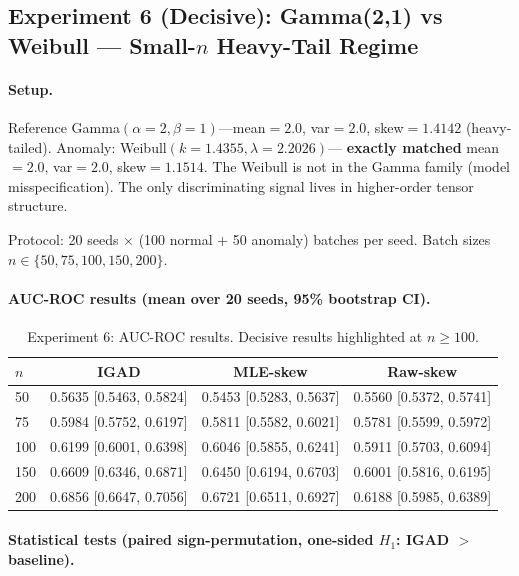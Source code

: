 \documentclass[12pt]{article}
\begin{document}
\subsection{Experiment 6 (Decisive): Gamma(2,1) vs Weibull --- Small-$n$ Heavy-Tail Regime}
\label{sec:exp-decisive}

\paragraph{Setup.}
Reference Gamma$(\alpha{=}2,\beta{=}1)$---mean$=2.0$, var$=2.0$,
skew$=1.4142$ (heavy-tailed). Anomaly: Weibull$(k{=}1.4355,\lambda{=}2.2026)$---%
\textbf{exactly matched} mean$=2.0$, var$=2.0$, skew$=1.1514$. The Weibull is
not in the Gamma family (model misspecification). The only discriminating signal
lives in higher-order tensor structure.

Protocol: 20 seeds $\times$ (100 normal + 50 anomaly) batches per seed.
Batch sizes $n \in \{50, 75, 100, 150, 200\}$.

\paragraph{AUC-ROC results (mean over 20 seeds, 95\% bootstrap CI).}

\begin{table}[h]
\centering
\caption{Experiment 6: AUC-ROC results. Decisive results highlighted at $n\geq 100$.}
\begin{tabular}{lccc}
\toprule
$n$ & IGAD & MLE-skew & Raw-skew \\
\midrule
50 & 0.5635 [0.5463, 0.5824] & 0.5453 [0.5283, 0.5637] & 0.5560 [0.5372, 0.5741] \\
75 & 0.5984 [0.5752, 0.6197] & 0.5811 [0.5582, 0.6021] & 0.5781 [0.5599, 0.5972] \\
100 & 0.6199 [0.6001, 0.6398] & 0.6046 [0.5855, 0.6241] & 0.5911 [0.5703, 0.6094] \\
150 & 0.6609 [0.6346, 0.6871] & 0.6450 [0.6194, 0.6703] & 0.6001 [0.5816, 0.6195] \\
200 & 0.6856 [0.6647, 0.7056] & 0.6721 [0.6511, 0.6927] & 0.6188 [0.5985, 0.6389] \\
\bottomrule
\end{tabular}
\end{table}

\paragraph{Statistical tests (paired sign-permutation, one-sided $H_1$: IGAD $>$ baseline).}
\end{document}
